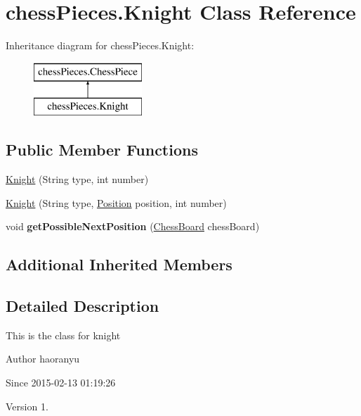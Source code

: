 \hypertarget{classchess_pieces_1_1_knight}{\section{chess\+Pieces.\+Knight Class Reference}
\label{classchess_pieces_1_1_knight}
}
Inheritance diagram for chess\+Pieces.\+Knight\+:\begin{figure}[H]
\begin{center}
\leavevmode
\includegraphics[height=2.000000cm]{classchess_pieces_1_1_knight}
\end{center}
\end{figure}
\subsection*{Public Member Functions}
\begin{DoxyCompactItemize}
\item 
\hyperlink{classchess_pieces_1_1_knight_aca1a0fe4a874da1aa6ebfa21afa9a6fc}{Knight} (String type, int number)
\item 
\hyperlink{classchess_pieces_1_1_knight_a60358d795fb1c3ea5288b31df4388096}{Knight} (String type, \hyperlink{classmodels_1_1_position}{Position} position, int number)
\item 
\hypertarget{classchess_pieces_1_1_knight_a41d69df8de591fe6717fb524ff0fcf42}{void {\bfseries get\+Possible\+Next\+Position} (\hyperlink{classmodels_1_1_chess_board}{Chess\+Board} chess\+Board)}\label{classchess_pieces_1_1_knight_a41d69df8de591fe6717fb524ff0fcf42}

\end{DoxyCompactItemize}
\subsection*{Additional Inherited Members}


\subsection{Detailed Description}
This is the class for knight \begin{DoxyAuthor}{Author}
haoranyu 
\end{DoxyAuthor}
\begin{DoxySince}{Since}
2015-\/02-\/13 01\+:19\+:26 
\end{DoxySince}
\begin{DoxyVersion}{Version}
1. 
\end{DoxyVersion}


